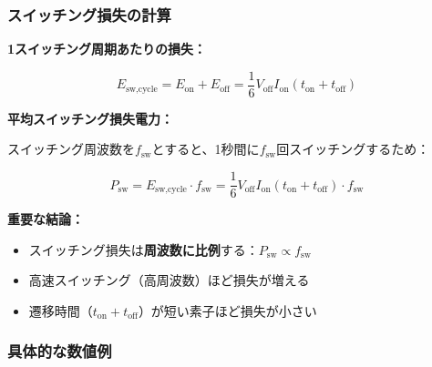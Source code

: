 \subsubsection{スイッチング損失の計算}

\begin{screen}
\textbf{1スイッチング周期あたりの損失：}

\begin{equation}
E_{\text{sw,cycle}} = E_{\text{on}} + E_{\text{off}} = \frac{1}{6} V_{\text{off}} I_{\text{on}} (t_{\text{on}} + t_{\text{off}})
\end{equation}

\textbf{平均スイッチング損失電力：}

スイッチング周波数を$f_{\text{sw}}$とすると、1秒間に$f_{\text{sw}}$回スイッチングするため：

\begin{equation}
\boxed{P_{\text{sw}} = E_{\text{sw,cycle}} \cdot f_{\text{sw}} = \frac{1}{6} V_{\text{off}} I_{\text{on}} (t_{\text{on}} + t_{\text{off}}) \cdot f_{\text{sw}}}
\end{equation}

\textbf{重要な結論：}

\begin{itemize}
\item スイッチング損失は\textbf{周波数に比例}する：$P_{\text{sw}} \propto f_{\text{sw}}$
\item 高速スイッチング（高周波数）ほど損失が増える
\item 遷移時間（$t_{\text{on}} + t_{\text{off}}$）が短い素子ほど損失が小さい
\end{itemize}
\end{screen}

\subsubsection{具体的な数値例}

